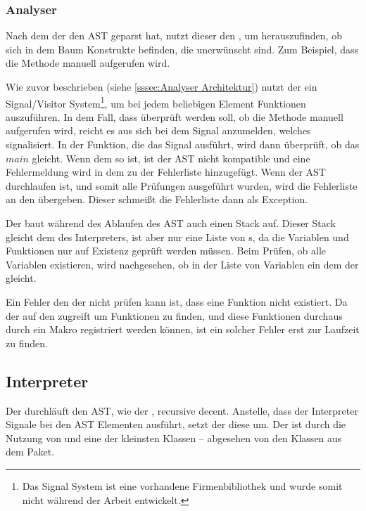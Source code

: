 {{    %
    \subsubsection{Analyser}
    \label{sssec:Analyser}
      Nach dem der  den AST geparst hat, nutzt dieser den , um herauszufinden, ob sich in dem Baum Konstrukte befinden, die unerwünscht sind. Zum Beispiel, dass die  Methode manuell aufgerufen wird.

      Wie zuvor beschrieben (siehe \autoref{sssec:Analyser Architektur}) nutzt der  ein Signal/Visitor System\footnote{
        Das Signal System ist eine vorhandene Firmenbibliothek und wurde somit nicht während der Arbeit entwickelt.
      }, um bei jedem beliebigen Element Funktionen auszuführen. In dem Fall, dass überprüft werden soll, ob die  Methode manuell aufgerufen wird, reicht es aus sich bei dem Signal anzumelden, welches  signalisiert. In der Funktion, die das Signal ausführt, wird dann überprüft, ob das  \myRIn$main$ gleicht. Wenn dem so ist, ist der AST nicht kompatible und eine Fehlermeldung wird in dem  zu der Fehlerliste hinzugefügt. Wenn der AST durchlaufen ist, und somit alle Prüfungen ausgeführt wurden, wird die Fehlerliste an den  übergeben. Dieser schmeißt die Fehlerliste dann als Exception.

      Der  baut während des Ablaufen des AST auch einen Stack auf. Dieser Stack gleicht dem des Interpreters, ist aber nur eine Liste von s, da die Variablen und Funktionen nur auf Existenz geprüft werden müssen. Beim Prüfen, ob alle Variablen existieren, wird nachgesehen, ob in der Liste von Variablen ein  dem der  gleicht.

      Ein Fehler den der  nicht prüfen kann ist, dass eine Funktion nicht existiert. Da der  auf den  zugreift um Funktionen zu finden, und diese Funktionen durchaus durch ein Makro registriert werden können, ist ein solcher Fehler erst zur Laufzeit zu finden.

  \subsection{Interpreter}
  \label{ssec:Interpreter}
    Der  durchläuft den AST, wie der , recursive decent. Anstelle, dass der Interpreter Signale bei den AST Elementen ausführt, setzt der  diese um. Der  ist durch die Nutzung von  und  eine der kleinsten Klassen -- abgesehen von den Klassen aus dem  Paket.

}}
